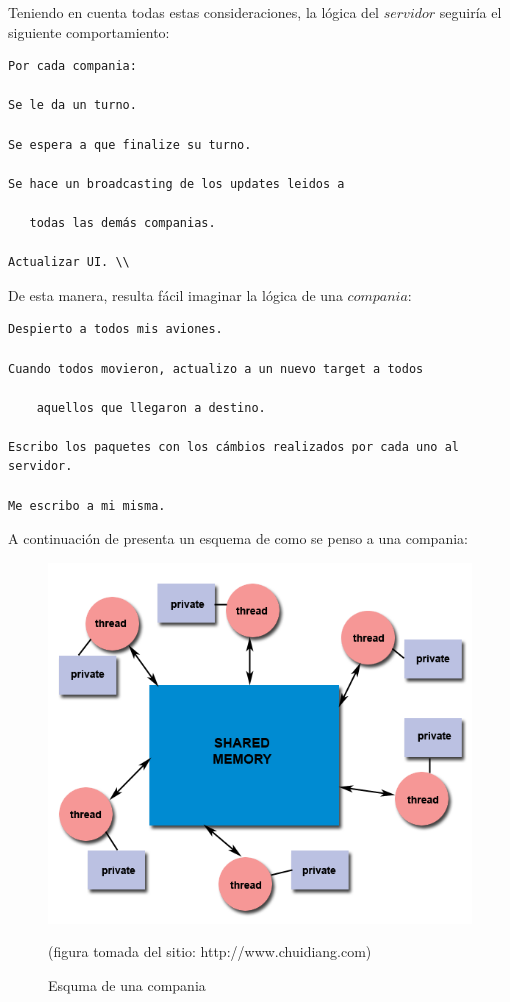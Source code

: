 \documentclass[a4paper,12pt,spanish]{article} %
\begin{document}
Teniendo en cuenta todas estas consideraciones, la lógica del $servidor$
seguiría el siguiente comportamiento:
\begin{verbatim}
Por cada compania:

Se le da un turno.

Se espera a que finalize su turno.

Se hace un broadcasting de los updates leidos a 

   todas las demás companias.

Actualizar UI. \\

\end{verbatim}
De esta manera, resulta fácil imaginar la lógica de una $compania$:
\begin{verbatim}
Despierto a todos mis aviones.

Cuando todos movieron, actualizo a un nuevo target a todos

    aquellos que llegaron a destino.

Escribo los paquetes con los cámbios realizados por cada uno al servidor.

Me escribo a mi misma.
\end{verbatim}
A continuación de presenta un esquema de como se penso a una compania:

\begin{figure}[H]
\hspace{1cm}\includegraphics[scale=0.5]{imagenes/airlineModl.png}

\caption{Esquma de una compania}
(figura tomada del sitio: http://www.chuidiang.com)
\end{figure}
\end{document}
